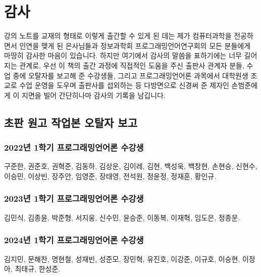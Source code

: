 \newpage

\section{감사}
강의 노트를 교재의 형태로 이렇게 출간할 수 있게 된 데는 제가 컴퓨터과학을 전공하면서
인연을 맺게 된 은사님들과 정보과학회 프로그래밍언어연구회의 모든 분들에게 마땅히 감사한 마음이 있습니다.
하지만 여기에서 감사의 말씀을 표하기에는 너무 길어지는 관계로,
우선 이 책의 출간 과정에 직접적인 도움을 주신 출판사 관계자 분들,
수업 중에 오탈자를 보고해 준 수강생들, 그리고 프로그래밍언어론 과목에서
대학원생 조교로 수업 운영을 도우며 출판사를 섭외하는 등 다방면으로
신경써 준 제자인 손범준에게 이 지면을 빌어 간단히나마 감사의 기록을 남깁니다.

\subsection{초판 원고 작업본 오탈자 보고}
\subsubsection{2022년 1학기 프로그래밍언어론 수강생}
구준한, 권준호, 권혁준, 김동하, 김상운, 김이레, 김현, 백성욱, 백창현, 손현승,
신현수, 이승민, 이상빈, 장주안, 임영준, 장태영, 전석원, 정윤정, 정재훈, 황인규.

\subsubsection{2023년 1학기 프로그래밍언어론 수강생}
김민식, 김종윤, 박준형, 서지웅, 신수민, 윤승준, 이동복, 이재혁, 임도은, 정종운.

\subsubsection{2024년 1학기 프로그래밍언어론 수강생}
김지민, 문해찬, 명현철, 성재빈, 성준모, 장민혁, 유진호, 이강준, 이규호, 이승현, 이정아, 최태규, 한성준.

\begin{comment}
\newpage

\section{다음 판에 추가할지 고려중인 주제}
\subsection{Control}
Continuation-Passing Style,
Delimited Continuations,
Coroutines, Exceptions, Async-Await,
Algebraic Effects,
Functor/Applicative/Monad/Monoid/...

\url{https://www.microsoft.com/en-us/research/wp-content/uploads/2016/08/algeff-tr-2016-v2.pdf}

\subsection{Staged Computation}
Interpreter vs. Compiler, Futamura Projections, Partial Evaluation

\end{comment}


